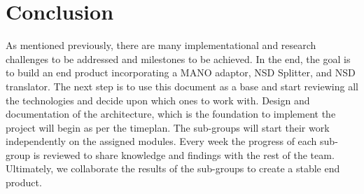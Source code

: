 \chapter{Conclusion}
\label{ch:Conclusion}
As mentioned previously, there are many implementational and research challenges to be addressed and milestones to be achieved.
In the end, the goal is to build an end product incorporating a MANO adaptor, NSD Splitter, and NSD translator. The next step is to use this document as a base and start reviewing all the technologies and decide upon which ones to work with. Design and documentation of the architecture, which is the foundation to implement the project will begin as per the timeplan.
The sub-groups will start their work independently on the assigned modules. Every week the progress of each sub-group is reviewed to share knowledge and findings with the rest of the team. Ultimately, we collaborate the results of the sub-groups to create a stable end product.


